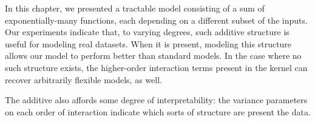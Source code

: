 In this chapter, we presented a tractable \gp{} model consisting of a sum of exponentially-many functions, each depending on a different subset of the inputs.
Our experiments indicate that, to varying degrees, such additive structure is useful for modeling real datasets.
When it is present, modeling this structure allows our model to perform better than standard \gp{} models.
In the case where no such structure exists, the higher-order interaction terms present in the kernel can recover arbitrarily flexible models, as well.

The additive \gp{} also affords some degree of interpretability: the variance parameters on each order of interaction indicate which sorts of structure are present the data.



\outbpdocument{


}





%
%





 
 



